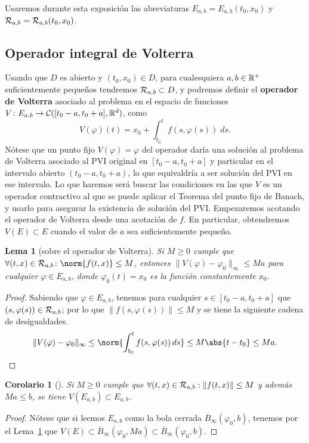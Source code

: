 \documentclass[11pt]{article}
\theoremstyle{plain}
\newtheorem{lemma}{Lema}
\newtheorem{corollary}{Corolario}
\theoremstyle{definition}
\theoremstyle{remark}
\begin{document}
Usaremos durante esta exposición las abreviaturas $E_{a,b} = E_{a,b}(t_0,x_0)$
y ${{\cal{R}}}_{a,b} = {{\cal{R}}}_{a,b}(t_0,x_0)$.


\subsection{Operador integral de Volterra}

Usando que $D$ es abierto y $(t_0,x_0) \in D$, para cualesquiera $a,b \in \mathbb{R}^+$ suficientemente pequeños
tendremos ${{\cal{R}}}_{a,b} \subset D$,
y podremos definir el \textbf{operador de Volterra} asociado al problema en el
espacio de funciones $V \colon E_{a,b} \to {\cal C}([t_0-a,t_0+a], \mathbb{R}^d)$, como
\[ V(\varphi)(t) = x_0 + \int_{t_0}^t f(s,\varphi(s))\;ds. \]
Nótese que un punto fijo $V(\varphi) = \varphi$ del operador daría una solución al problema
de Volterra asociado al PVI original en $[t_0-a,t_0+a]$ y particular en el intervalo abierto $(t_0-a,t_0+a)$, lo
que equivaldría a ser solución del PVI en ese intervalo. Lo que haremos será
buscar las condiciones en las que $V$ es un operador contractivo al que se
puede aplicar el Teorema del punto fijo de Banach, y usarlo para asegurar
la existencia de solución del PVI\@. Empezaremos acotando el
operador de Volterra desde una acotación de $f$. En particular, obtendremos $V(E) \subset E$
cuando el valor de $a$ sea suficientemente pequeño.


\begin{lemma}[sobre el operador de Volterra]\label{lema-operador-volterra}
  Si $M\geq 0$ cumple que $\forall (t,x) \in \eR_{a,b}\colon \norm{f(t,x)} \leq M$, entonces
  \(\|V(\varphi) - \varphi_0\|_{\infty} \leq Ma\) para cualquier \(\varphi \in E_{a,b}\),
  donde $\varphi_0(t) = x_0$ es la función constantemente $x_0$.
\end{lemma}
\begin{proof}
  Sabiendo que \(\varphi \in E_{a,b}\), tenemos para cualquier \(s \in [t_0-a,t_0+a]\)
  que \((s,\varphi(s)) \in {{\cal{R}}}_{a,b}\); por lo que \(\|f(s,\varphi(s))\| \leq M\) y
  se tiene la siguiente cadena de desigualdades.
  \[ \| V(\varphi) - \varphi_0 \|_{\infty} \leq
    \norm{ \int_{t_0}^t f(s,\varphi(s))\,ds } \leq
    M\abs{t - t_0} \leq
    Ma.\qedhere\]
\end{proof}

\begin{corollary}[]\label{corolario-1-volterra}
  Si \(M \geq 0\) cumple que \(\forall (t,x) \in {{\cal{R}}}_{a,b}: \|f(t,x)\| \leq M\)
  y además \(Ma \leq b\), se tiene \(V(E_{a,b}) \subset E_{a,b}\).
\end{corollary}
\begin{proof}
  Nótese que si leemos \(E_{a,b}\) como la bola cerrada \(\overline{B}_{\infty}(\varphi_0,b)\), tenemos
  por el Lema~\ref{lema-operador-volterra} que \(V(E) \subset \overline{B}_{\infty}(\varphi_0,Ma) \subset \overline{B}_{\infty}(\varphi_0,b)\).
\end{proof}
\end{document}

